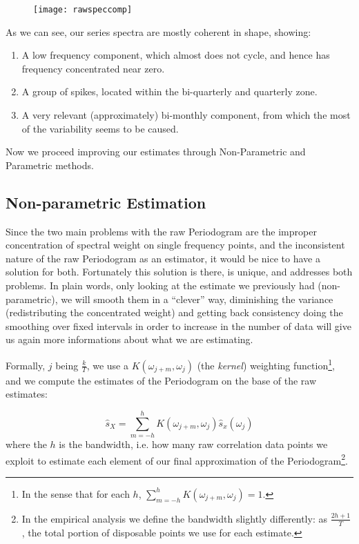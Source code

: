 \documentclass[12pt]{article} %
\begin{document}
\begin{figure}[h!]
\begin{center}
\texttt{[image: rawspeccomp]}
\caption{}
\end{center}
\end{figure}


As we can see, our series spectra are mostly coherent in shape, showing:

\begin{enumerate}
\item A low frequency component, which almost does not cycle, and hence has frequency concentrated near zero.
\item A group of spikes, located within the bi-quarterly and quarterly zone.
\item A very relevant (approximately) bi-monthly component, from which the most of the variability seems to be caused.
\end{enumerate}

Now we proceed improving our estimates through Non-Parametric and Parametric methods.

\subsection{Non-parametric Estimation}

Since the two main problems with the raw Periodogram are the improper concentration of spectral weight on single frequency points, and the inconsistent nature of the raw Periodogram as an estimator, it would be nice to have a solution for both. Fortunately this solution is there, is unique, and addresses both problems. In plain words, only looking at the estimate we previously had (non-parametric), we will smooth them in a ``clever'' way, diminishing the variance (redistributing the concentrated weight) and getting back consistency doing the smoothing over fixed intervals in order to increase in the number of data will give us again more informations about what we are estimating.

Formally, $j$ being $\frac{k}{T}$, we use a $K(\omega_{j+m},\omega_j)$ (the {\em kernel}) weighting function\footnote{
In the sense that for each $h$, $\sum_{m=-h}^{h}K(\omega_{j+m},\omega_j)=1$.}, and we compute the estimates of the Periodogram on the base of the raw estimates:

\begin{equation}
\hat{s}_X=\sum\limits_{m=-h}^{h} K(\omega_{j+m},\omega_j)\hat{s}_x(\omega_j)
\end{equation}where the $h$ is the bandwidth, i.e. how many raw correlation data points we exploit to estimate each element of our final approximation of the Periodogram\footnote{In the empirical analysis we define the bandwidth slightly differently: as $\frac{2h+1}{T}$, the total portion of disposable points we use for each estimate.}. 
\end{document}
